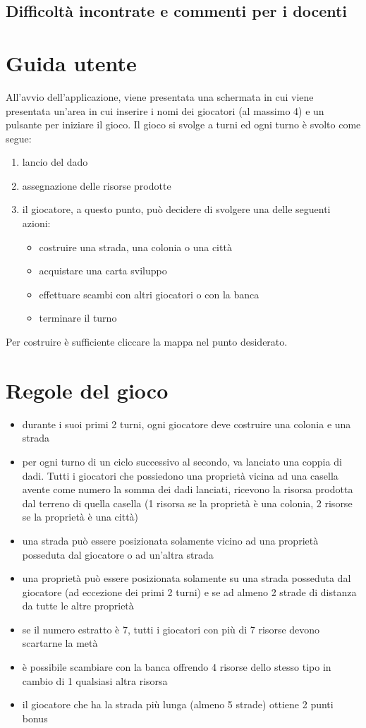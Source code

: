 \documentclass[a4paper,12pt]{report}
\begin{document}
\section{Difficoltà incontrate e commenti per i docenti}

\appendix
\chapter{Guida utente}
All'avvio dell'applicazione, viene presentata una schermata in cui viene presentata un'area in cui inserire i nomi dei giocatori (al massimo 4) e un pulsante per iniziare il gioco. Il gioco si svolge a turni ed ogni turno è svolto come segue:
\begin{enumerate}
    \item lancio del dado
    \item assegnazione delle risorse prodotte
    \item il giocatore, a questo punto, può decidere di svolgere una delle seguenti azioni:
    \begin{itemize}
        \item costruire una strada, una colonia o una città
        \item acquistare una carta sviluppo
        \item effettuare scambi con altri giocatori o con la banca
        \item terminare il turno
    \end{itemize}
\end{enumerate}
Per costruire è sufficiente cliccare la mappa nel punto desiderato.

\chapter{Regole del gioco}
\begin{itemize}
    \item durante i suoi primi 2 turni, ogni giocatore deve costruire una colonia e una strada
    \item per ogni turno di un ciclo successivo al secondo, va lanciato una coppia di dadi. Tutti i giocatori che possiedono una proprietà vicina ad una casella avente come numero la somma dei dadi lanciati, ricevono la risorsa prodotta dal terreno di quella casella (1 risorsa se la proprietà è una colonia, 2 risorse se la proprietà è una città)
    \item una strada può essere posizionata solamente vicino ad una proprietà posseduta dal giocatore o ad un'altra strada
    \item una proprietà può essere posizionata solamente su una strada posseduta dal giocatore (ad eccezione dei primi 2 turni) e se ad almeno 2 strade di distanza da tutte le altre proprietà
    \item se il numero estratto è 7, tutti i giocatori con più di 7 risorse devono scartarne la metà
    \item è possibile scambiare con la banca offrendo 4 risorse dello stesso tipo in cambio di 1 qualsiasi altra risorsa
    \item il giocatore che ha la strada più lunga (almeno 5 strade) ottiene 2 punti bonus
\end{itemize}
\end{document}
